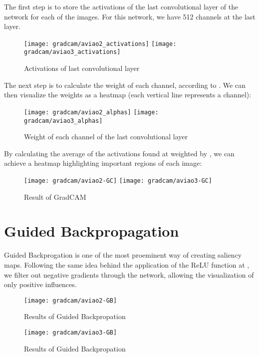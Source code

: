 The first step is to store the activations of the last convolutional layer of the network for each of the images. For this network, we have 512 channels at the last layer.


\begin{figure}
    \centering
    \texttt{[image: gradcam/aviao2\_activations]}
    \texttt{[image: gradcam/aviao3\_activations]}
    \caption{Activations of last convolutional layer}
    \label{fig:activations}
\end{figure}

The next step is to calculate the weight of each channel, according to \cite{eq:alpha}. We can then visualize the weights as a heatmap (each vertical line represents a channel):

\begin{figure}
    \centering
    \texttt{[image: gradcam/aviao2\_alphas]}
    \texttt{[image: gradcam/aviao3\_alphas]}
    \caption{Weight of each channel of the last convolutional layer}
    \label{fig:weights}
\end{figure}

By calculating the average of the activations found at \cite{fig:actiovations} weighted by \label{fig:weights}, we can achieve a heatmap highlighting important regions of each image:

\begin{figure}[H]
    \centering
    \texttt{[image: gradcam/aviao2-GC]}
    \texttt{[image: gradcam/aviao3-GC]}
    \caption{Result of GradCAM}
\end{figure}


\section{Guided Backpropagation}

Guided Backprogation is one of the most proeminent way of creating saliency maps. Following the same idea behind the application of the ReLU function at \cite{eq:heatmap}, we filter out negative gradients through the network, allowing the visualization of only positive influences.

\begin{figure}
    \centering
    \texttt{[image: gradcam/aviao2-GB]}    
    \caption{Results of Guided Backpropation}
\end{figure}

\begin{figure}
    \centering
    \texttt{[image: gradcam/aviao3-GB]}    
    \caption{Results of Guided Backpropation}
\end{figure}

